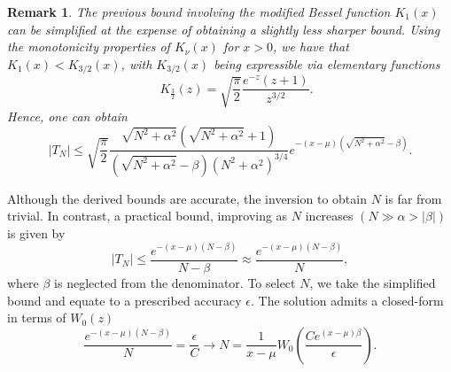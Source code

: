 \documentclass[10pt,a4paper,oneside]{article}
\newtheorem{remark}[theorem]{Remark}
\numberwithin{equation}{section}
\begin{document}
\begin{remark}The previous bound involving the modified Bessel function $K_1(x)$ can be simplified at the expense of obtaining a slightly less sharper bound. Using the monotonicity properties of $K_{\nu}(x)$ for $x > 0$, we have that $K_1(x) < K_{3/2}(x)$, with $K_{3/2}(x)$ being expressible via elementary functions
\begin{equation*}
\quad K_{\frac{3}{2}}(z) = \sqrt{\frac{\pi}{2}}\frac{e^{-z} (z+1)}{z^{3/2}}.
\end{equation*}
Hence, one can obtain
\begin{equation}
|T_N| \le \sqrt{\frac{\pi}{2}} \frac{\sqrt{N^2 + \alpha^2}(\sqrt{N^2 + \alpha^2} + 1)}{(\sqrt{N^2 + \alpha^2} - \beta)\left(N^2 + \alpha^2\right)^{3/4}} e^{-(x-\mu)\left(\sqrt{N^2 + \alpha^2} - \beta\right)}.
\end{equation}
\end{remark}
Although the derived bounds are accurate, the inversion to obtain $N$ is far from trivial. In contrast, a practical bound, improving as $N$ increases $(N \gg \alpha > |\beta|)$ is given by
\begin{equation}
|T_N| \le \frac{e^{-(x-\mu)(N - \beta)}}{N - \beta} \approx \frac{e^{-(x-\mu)(N-\beta)}}{N},
\end{equation}
where $\beta$ is neglected from the denominator. To select $N$, we take the simplified bound and equate to a prescribed accuracy $\epsilon$. The solution admits a closed-form in terms of $W_0(z)$
\begin{equation}
\frac{e^{-(x-\mu)(N-\beta)}}{N} = \frac{\epsilon}{C} \longrightarrow N = \frac{1}{x-\mu}W_0\left(\frac{C e^{(x-\mu)\beta}}{\epsilon}\right).
\end{equation}
\end{document}
